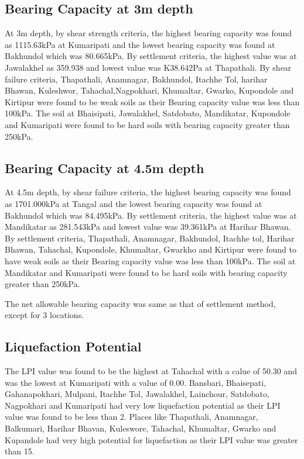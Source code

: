 \subsection{Bearing Capacity at 3m depth}
At 3m depth, by shear strength criteria, the highest bearing capacity was found as 1115.63kPa at Kumaripati and the lowest bearing capacity was found at Bakhundol which was 80.665kPa. By settlement criteria, the highest value was at Jawalakhel as 359.938 and lowest value was K38.642Pa at Thapathali. By shear failure criteria, Thapathali, Anamnagar, Bakhundol, Itachhe Tol, harihar Bhawan, Kuleshwor, Tahachal,Nagpokhari, Khumaltar, Gwarko, Kupondole and Kirtipur were found to be weak soils as their Bearing capacity value was less than 100kPa. The soil at Bhaisipati, Jawalakhel, Satdobato, Mandikatar, Kupondole and Kumaripati were found to be hard soils with bearing capacity greater than 250kPa.

\subsection{Bearing Capacity at 4.5m depth}
At 4.5m depth, by shear failure criteria, the highest bearing capacity was found as 1701.000kPa at Tangal and the lowest bearing capacity was found at Bakhundol which was 84.495kPa. By settlement criteria, the highest value was at Mandikatar as 281.543kPa and lowest value was 39.361kPa at Harihar Bhawan. By settlement criteria, Thapathali, Anamnagar, Bakhundol, Itachhe tol, Harihar Bhawan, Tahachal, Kupondole, Khumaltar, Gwarkho and Kirtipur were found to have weak soils as their Bearing capacity value was less than 100kPa. The soil at Mandikatar and Kumaripati were found to be hard soils with bearing capacity greater than 250kPa.

The net allowable bearing capacity was same as that of settlement method, except for 3 locations.

\subsection{Liquefaction Potential}
The LPI value was found to be the highest at Tahachal with a calue of 50.30 and was the lowest at Kumaripati with a value of 0.00. Bansbari, Bhaisepati, Gahanapokhari, Mulpani, Itachhe Tol, Jawalakhel, Lainchour, Satdobato, Nagpokhari and Kumaripati had very low liquefaction potential as their LPI value was found to be less than 2. Places like Thapathali, Anamnagar, Balkumari, Harihar Bhavan, Kuleswore, Tahachal, Khumaltar, Gwarko and Kupandole had very high potential for liquefaction as their LPI value was greater than 15.

